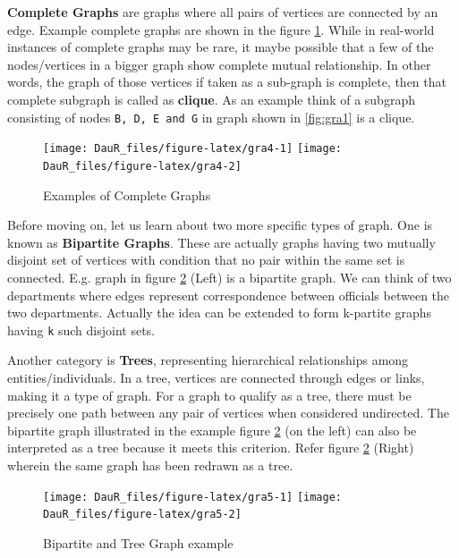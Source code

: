 \documentclass[
]{book}
\begin{document}
\textbf{Complete Graphs} are graphs where all pairs of vertices are connected by an edge. Example complete graphs are shown in the figure \ref{fig:gra4}. While in real-world instances of complete graphs may be rare, it maybe possible that a few of the nodes/vertices in a bigger graph show complete mutual relationship. In other words, the graph of those vertices if taken as a sub-graph is complete, then that complete subgraph is called as \textbf{clique}. As an example think of a subgraph consisting of nodes \texttt{B,\ D,\ E\ and\ G} in graph shown in \ref{fig:gra1} is a clique.

\begin{figure}

{\centering \texttt{[image: DauR\_files/figure-latex/gra4-1]} \texttt{[image: DauR\_files/figure-latex/gra4-2]} 

}

\caption{Examples of Complete Graphs}\label{fig:gra4}
\end{figure}

Before moving on, let us learn about two more specific types of graph. One is known as \textbf{Bipartite Graphs}. These are actually graphs having two mutually disjoint set of vertices with condition that no pair within the same set is connected. E.g. graph in figure \ref{fig:gra5} (Left) is a bipartite graph. We can think of two departments where edges represent correspondence between officials between the two departments. Actually the idea can be extended to form k-partite graphs having \texttt{k} such disjoint sets.

Another category is \textbf{Trees}, representing hierarchical relationships among entities/individuals. In a tree, vertices are connected through edges or links, making it a type of graph. For a graph to qualify as a tree, there must be precisely one path between any pair of vertices when considered undirected. The bipartite graph illustrated in the example figure \ref{fig:gra5} (on the left) can also be interpreted as a tree because it meets this criterion. Refer figure \ref{fig:gra5} (Right) wherein the same graph has been redrawn as a tree.

\begin{figure}

{\centering \texttt{[image: DauR\_files/figure-latex/gra5-1]} \texttt{[image: DauR\_files/figure-latex/gra5-2]} 

}

\caption{Bipartite and Tree Graph example}\label{fig:gra5}
\end{figure}
\end{document}
